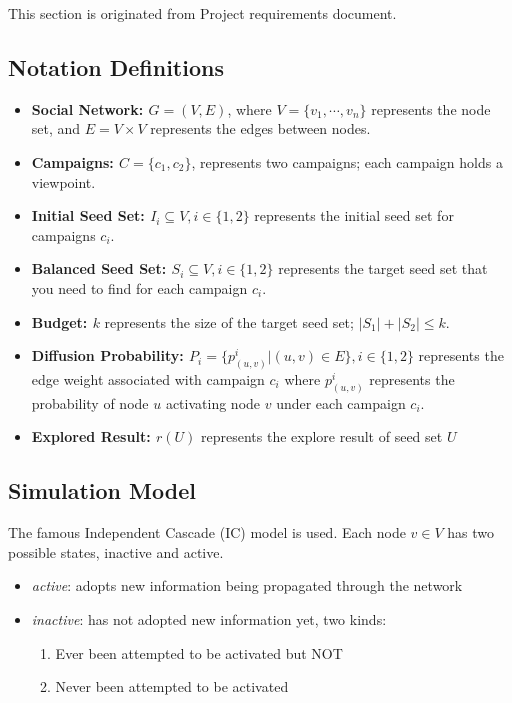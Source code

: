 \documentclass{article}
\begin{document}
This section is originated from Project requirements document.

\subsection{Notation Definitions}

\begin{itemize}
    \item \textbf{Social Network: $G = (V, E)$}, where $V = \{v_1, \cdots , v_n\}$ represents the node set, and $E = V \times V$ represents the edges between nodes.
    \item \textbf{Campaigns: $C = \{c_1, c_2\}$}, represents two campaigns; each campaign holds a viewpoint.
    \item \textbf{Initial Seed Set: $I_i \subseteq V, i \in \{1, 2\}$} represents the initial seed set for campaigns $c_i$.
    \item \textbf{Balanced Seed Set: $S_i \subseteq V, i \in \{1, 2\}$} represents the target seed set that you need to find for each campaign $c_i$.
    \item \textbf{Budget: $k$} represents the size of the target seed set; $|S_1|+ |S_2| \leq k$.
    \item \textbf{Diffusion Probability: $P_i = \{p^i_{(u,v)}|(u,v) \in E\}, i \in \{1, 2\}$} represents the edge weight associated with campaign $c_i$ where $p^i_{(u,v)}$ represents the  probability of node $u$ activating node $v$ under each campaign $c_i$.
    \item \textbf{Explored Result: $r(U)$} represents the explore result of seed set $U$
\end{itemize}


\subsection{Simulation Model}

The famous Independent Cascade (IC) model is used. Each node $v \in V$ has two possible states, inactive and active.


\begin{itemize}
    \item \emph{active}: adopts new information being propagated through the network
    \item \emph{inactive}: has not adopted new information yet, two kinds:
    \begin{enumerate}[label=\roman*]
        \item Ever been attempted to be activated but NOT
        \item Never been attempted to be activated 
    \end{enumerate}
\end{itemize}
 
\end{document}
